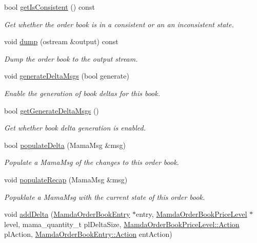 \begin{CompactItemize}
bool \hyperlink{classWombat_1_1MamdaOrderBook_faac1ded1eefd6cc50dfcddc29f106b4}{get\-Is\-Consistent} () const 
\begin{CompactList}\small\item\em Get whether the order book is in a consistent or an an inconsistent state. \item\end{CompactList}\item 
void \hyperlink{classWombat_1_1MamdaOrderBook_08e81be1a8c8751b353e20b7b2747e24}{dump} (ostream \&output) const 
\begin{CompactList}\small\item\em Dump the order book to the output stream. \item\end{CompactList}\item 
void \hyperlink{classWombat_1_1MamdaOrderBook_ea8696a68ae878e16263cec2f4076587}{generate\-Delta\-Msgs} (bool generate)
\begin{CompactList}\small\item\em Enable the generation of book deltas for this book. \item\end{CompactList}\item 
bool \hyperlink{classWombat_1_1MamdaOrderBook_5d6ece340bb0b0e8586122c094bdd9cc}{get\-Generate\-Delta\-Msgs} ()
\begin{CompactList}\small\item\em Get whether book delta generation is enabled. \item\end{CompactList}\item 
bool \hyperlink{classWombat_1_1MamdaOrderBook_1b4350eadb899786bdb744a329f4b2b4}{populate\-Delta} (Mama\-Msg \&msg)
\begin{CompactList}\small\item\em Populate a Mama\-Msg of the changes to this order book. \item\end{CompactList}\item 
void \hyperlink{classWombat_1_1MamdaOrderBook_a271c067c845a6d73ea69fba6e701320}{populate\-Recap} (Mama\-Msg \&msg)
\begin{CompactList}\small\item\em Popuklate a Mama\-Msg with the current state of this order book. \item\end{CompactList}\item 
void \hyperlink{classWombat_1_1MamdaOrderBook_a1a9d7495d9b482e5f7f01bc34832820}{add\-Delta} (\hyperlink{classWombat_1_1MamdaOrderBookEntry}{Mamda\-Order\-Book\-Entry} $\ast$entry, \hyperlink{classWombat_1_1MamdaOrderBookPriceLevel}{Mamda\-Order\-Book\-Price\-Level} $\ast$level, mama\_\-quantity\_\-t pl\-Delta\-Size, \hyperlink{classWombat_1_1MamdaOrderBookPriceLevel_bd3407b4250fc6f7a42d94b6d32e358a}{Mamda\-Order\-Book\-Price\-Level::Action} pl\-Action, \hyperlink{classWombat_1_1MamdaOrderBookEntry_fc6cb1d67c7601d093a36f59cf9bcef4}{Mamda\-Order\-Book\-Entry::Action} ent\-Action)

\end{CompactItemize}
